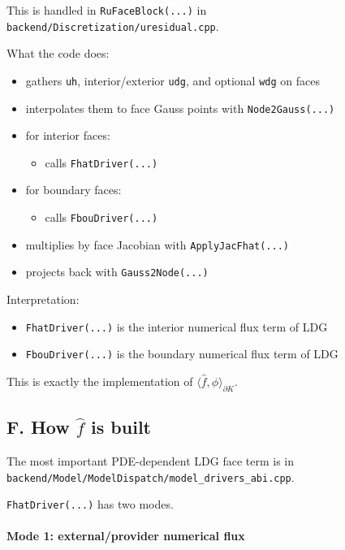 \documentclass[11pt]{article}
\begin{document}
This is handled in \texttt{RuFaceBlock(...)} in
\texttt{backend/Discretization/uresidual.cpp}.

What the code does:

\begin{itemize}[leftmargin=*]
\item gathers \texttt{uh}, interior/exterior \texttt{udg}, and optional
\texttt{wdg} on faces
\item interpolates them to face Gauss points with \texttt{Node2Gauss(...)}
\item for interior faces:
\begin{itemize}[leftmargin=*]
\item calls \texttt{FhatDriver(...)}
\end{itemize}
\item for boundary faces:
\begin{itemize}[leftmargin=*]
\item calls \texttt{FbouDriver(...)}
\end{itemize}
\item multiplies by face Jacobian with \texttt{ApplyJacFhat(...)}
\item projects back with \texttt{Gauss2Node(...)}
\end{itemize}

Interpretation:

\begin{itemize}[leftmargin=*]
\item \texttt{FhatDriver(...)} is the interior numerical flux term of LDG
\item \texttt{FbouDriver(...)} is the boundary numerical flux term of LDG
\end{itemize}

This is exactly the implementation of $\langle \hat{f}, \phi \rangle_{\partial K}$.

\subsection*{F. How $\hat{f}$ is built}

The most important PDE-dependent LDG face term is in
\texttt{backend/Model/ModelDispatch/model\_drivers\_abi.cpp}.

\texttt{FhatDriver(...)} has two modes.

\paragraph{Mode 1: external/provider numerical flux}
\end{document}
